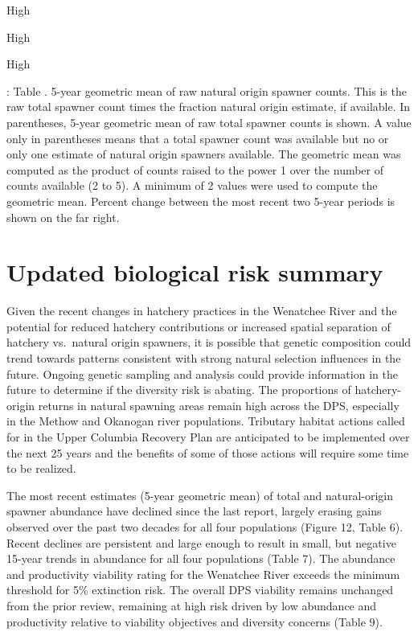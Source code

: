 \documentclass[
  letterpaper,
  oneside,
  open=any]{scrbook}
\begin{document}
High

High

High

: Table . 5-year geometric mean of raw natural origin spawner counts.
This is the raw total spawner count times the fraction natural origin
estimate, if available. In parentheses, 5-year geometric mean of raw
total spawner counts is shown. A value only in parentheses means that a
total spawner count was available but no or only one estimate of natural
origin spawners available. The geometric mean was computed as the
product of counts raised to the power 1 over the number of counts
available (2 to 5). A minimum of 2 values were used to compute the
geometric mean. Percent change between the most recent two 5-year
periods is shown on the far right.

\hypertarget{updated-biological-risk-summary}{%
\section{Updated biological risk
summary}\label{updated-biological-risk-summary}}

Given the recent changes in hatchery practices in the Wenatchee River
and the potential for reduced hatchery contributions or increased
spatial separation of hatchery vs.~natural origin spawners, it is
possible that genetic composition could trend towards patterns
consistent with strong natural selection influences in the future.
Ongoing genetic sampling and analysis could provide information in the
future to determine if the diversity risk is abating. The proportions of
hatchery-origin returns in natural spawning areas remain high across the
DPS, especially in the Methow and Okanogan river populations. Tributary
habitat actions called for in the Upper Columbia Recovery Plan are
anticipated to be implemented over the next 25 years and the benefits of
some of those actions will require some time to be realized.

The most recent estimates (5-year geometric mean) of total and
natural-origin spawner abundance have declined since the last report,
largely erasing gains observed over the past two decades for all four
populations (Figure 12, Table 6). Recent declines are persistent and
large enough to result in small, but negative 15-year trends in
abundance for all four populations (Table 7). The abundance and
productivity viability rating for the Wenatchee River exceeds the
minimum threshold for 5\% extinction risk. The overall DPS viability
remains unchanged from the prior review, remaining at high risk driven
by low abundance and productivity relative to viability objectives and
diversity concerns (Table 9).
\end{document}
